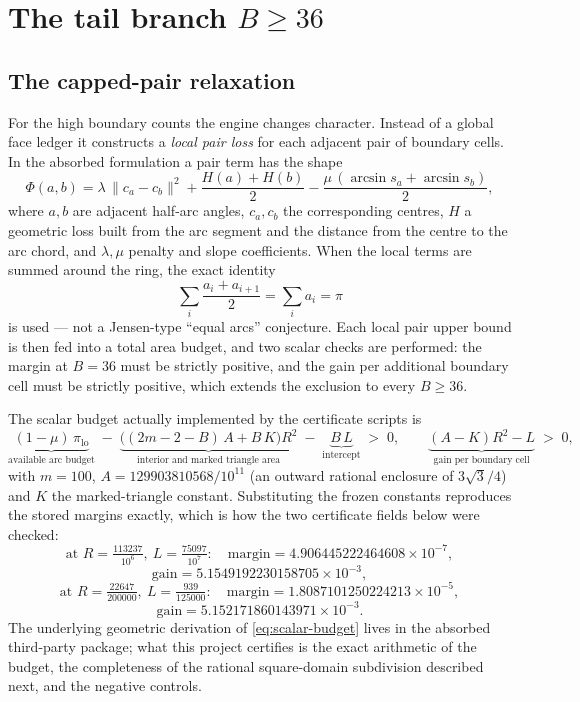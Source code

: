 \section{The tail branch $B\ge36$}

\subsection{The capped-pair relaxation}

For the high boundary counts the engine changes character. Instead of a global face ledger it
constructs a \emph{local pair loss} for each adjacent pair of boundary cells. In the absorbed
formulation a pair term has the shape
\[
\Phi(a,b)=\lambda\,\|c_a-c_b\|^2+\frac{H(a)+H(b)}{2}-\frac{\mu\,(\arcsin s_a+\arcsin s_b)}{2},
\]
where $a,b$ are adjacent half-arc angles, $c_a,c_b$ the corresponding centres, $H$ a geometric loss
built from the arc segment and the distance from the centre to the arc chord, and
$\lambda,\mu$ penalty and slope coefficients. When the local terms are summed around the ring, the
exact identity
\[
\sum_i\frac{a_i+a_{i+1}}2=\sum_i a_i=\pi
\]
is used --- not a Jensen-type ``equal arcs'' conjecture. Each local pair upper bound is then fed into
a total area budget, and two scalar checks are performed: the margin at $B=36$ must be strictly
positive, and the gain per additional boundary cell must be strictly positive, which extends the
exclusion to every $B\ge36$.

The scalar budget actually implemented by the certificate scripts is
\begin{equation}\label{eq:scalar-budget}
\underbrace{(1-\mu)\,\pi_{\mathrm{lo}}}_{\text{available arc budget}}
\;-\;\underbrace{\bigl((2m-2-B)\,A+B\,K\bigr)R^2}_{\text{interior and marked triangle area}}
\;-\;\underbrace{B\,L}_{\text{intercept}}\;>\;0,
\qquad
\underbrace{(A-K)R^2-L}_{\text{gain per boundary cell}}\;>\;0,
\end{equation}
with $m=100$, $A=129903810568/10^{11}$ (an outward rational enclosure of $3\sqrt3/4$) and $K$ the
marked-triangle constant. Substituting the frozen constants reproduces the stored margins exactly,
which is how the two certificate fields below were checked:
\[
\text{at }R=\tfrac{113237}{10^6},\ L=\tfrac{75097}{10^7}:\quad
\text{margin}=4.906445222464608\times10^{-7},
\]
\[
\text{gain}=5.1549192230158705\times10^{-3},
\]
\[
\text{at }R=\tfrac{22647}{200000},\ L=\tfrac{939}{125000}:\quad
\text{margin}=1.8087101250224213\times10^{-5},
\]
\[
\text{gain}=5.152171860143971\times10^{-3}.
\]
The underlying geometric derivation of \eqref{eq:scalar-budget} lives in the absorbed third-party
package; what this project certifies is the exact arithmetic of the budget, the completeness of the
rational square-domain subdivision described next, and the negative controls.

